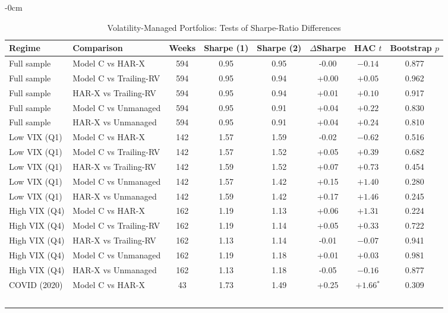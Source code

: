 
\begin{table}[htbp]
\begin{adjustwidth}{-\extralength}{0cm}
\centering
\caption{Volatility-Managed Portfolios: Tests of Sharpe-Ratio Differences}
\label{tab:sharpe_tests}
\footnotesize
\setlength{\tabcolsep}{4pt}
\begin{tabular}{llcccccc}
\toprule
Regime & Comparison & Weeks & Sharpe (1) & Sharpe (2) & $\Delta$Sharpe & HAC $t$ & Bootstrap $p$ \\
\midrule
Full sample & Model C vs HAR-X & 594 & 0.95 & 0.95 & -0.00 & $-0.14$ & 0.877 \\
Full sample & Model C vs Trailing-RV & 594 & 0.95 & 0.94 & +0.00 & $+0.05$ & 0.962 \\
Full sample & HAR-X vs Trailing-RV & 594 & 0.95 & 0.94 & +0.01 & $+0.10$ & 0.917 \\
Full sample & Model C vs Unmanaged & 594 & 0.95 & 0.91 & +0.04 & $+0.22$ & 0.830 \\
Full sample & HAR-X vs Unmanaged & 594 & 0.95 & 0.91 & +0.04 & $+0.24$ & 0.810 \\
Low VIX (Q1) & Model C vs HAR-X & 142 & 1.57 & 1.59 & -0.02 & $-0.62$ & 0.516 \\
Low VIX (Q1) & Model C vs Trailing-RV & 142 & 1.57 & 1.52 & +0.05 & $+0.39$ & 0.682 \\
Low VIX (Q1) & HAR-X vs Trailing-RV & 142 & 1.59 & 1.52 & +0.07 & $+0.73$ & 0.454 \\
Low VIX (Q1) & Model C vs Unmanaged & 142 & 1.57 & 1.42 & +0.15 & $+1.40$ & 0.280 \\
Low VIX (Q1) & HAR-X vs Unmanaged & 142 & 1.59 & 1.42 & +0.17 & $+1.46$ & 0.245 \\
High VIX (Q4) & Model C vs HAR-X & 162 & 1.19 & 1.13 & +0.06 & $+1.31$ & 0.224 \\
High VIX (Q4) & Model C vs Trailing-RV & 162 & 1.19 & 1.14 & +0.05 & $+0.33$ & 0.722 \\
High VIX (Q4) & HAR-X vs Trailing-RV & 162 & 1.13 & 1.14 & -0.01 & $-0.07$ & 0.941 \\
High VIX (Q4) & Model C vs Unmanaged & 162 & 1.19 & 1.18 & +0.01 & $+0.03$ & 0.981 \\
High VIX (Q4) & HAR-X vs Unmanaged & 162 & 1.13 & 1.18 & -0.05 & $-0.16$ & 0.877 \\
COVID (2020) & Model C vs HAR-X & 43 & 1.73 & 1.49 & +0.25 & $+1.66$$^{*}$ & 0.309 \\
$$
\end{tabular}
\end{adjustwidth}
\end{table}
